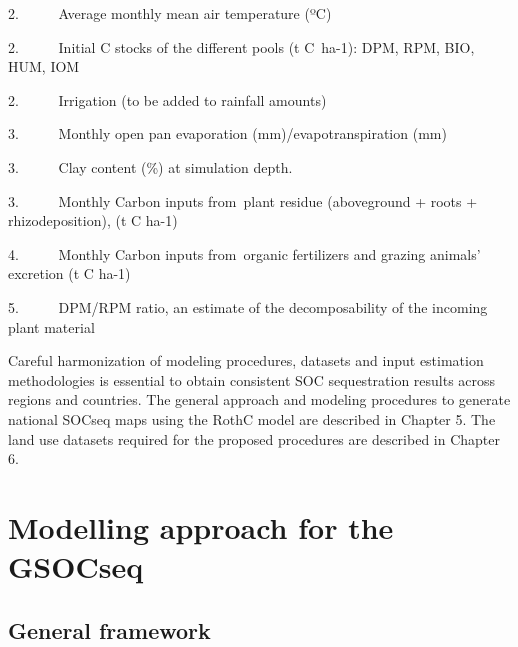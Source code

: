 \documentclass[
  10pt,
  b5paper,
]{book}
\begin{document}
2.~~~~~ Average monthly mean air temperature (ºC)

2.~~~~~ Initial C stocks of the different pools (t C~ha-1): DPM, RPM, BIO, HUM, IOM

2.~~~~~ Irrigation (to be added to rainfall amounts)

3.~~~~~ Monthly open pan evaporation (mm)/evapotranspiration (mm)

3.~~~~~ Clay content (\%) at simulation depth.

3.~~~~~ Monthly Carbon inputs from~plant residue (aboveground + roots + rhizodeposition), (t C ha-1)

4.~~~~~ Monthly Carbon inputs from~organic fertilizers and grazing animals' excretion (t C ha-1)

5.~~~~~ DPM/RPM ratio, an estimate of the decomposability of the incoming plant material

Careful harmonization of modeling procedures, datasets and input estimation methodologies is essential to obtain consistent SOC sequestration results across regions and countries. The general approach and modeling procedures to generate national SOCseq maps using the RothC model are described in Chapter 5. The land use datasets required for the proposed procedures are described in Chapter 6.

\hypertarget{modelling-approach-for-the-gsocseq}{%
\chapter{\textbar{} Modelling approach for the GSOCseq}\label{modelling-approach-for-the-gsocseq}}

\hypertarget{general-framework}{%
\section{General framework}\label{general-framework}}
\end{document}
